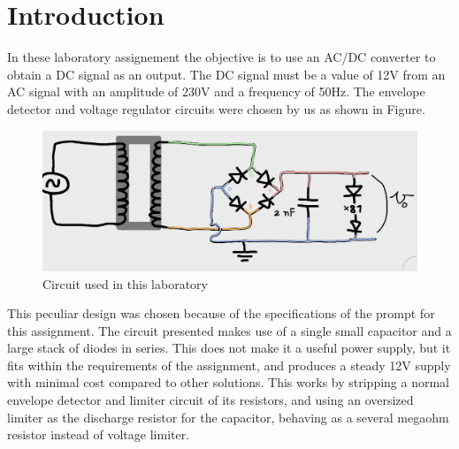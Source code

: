 \section{Introduction}
\label{sec:intro}


In these laboratory assignement the objective is to use an AC/DC converter to obtain a DC signal as an output. The DC signal must be a value of 12V from an AC signal with an amplitude of 230V and a frequency of 50Hz. The envelope detector and voltage regulator circuits were chosen by us as shown in Figure.


\begin{figure} [!htb] 
  \includegraphics[width=\linewidth]{circuito.png}
  \caption{Circuit used in this laboratory}
  \label{fig:theoplots}
  \endminipage\hfill
\end{figure}

This peculiar design was chosen because of the specifications of the prompt for this assignment. The circuit presented makes use of a single small capacitor and a large stack of diodes in series. This does not make it a useful power supply, but it fits within the requirements of the assignment, and produces a steady 12V supply with minimal cost compared to other solutions. This works by stripping a normal envelope detector and limiter circuit of its resistors, and using an oversized limiter as the discharge resistor for the capacitor, behaving as a several megaohm resistor instead of voltage limiter.
